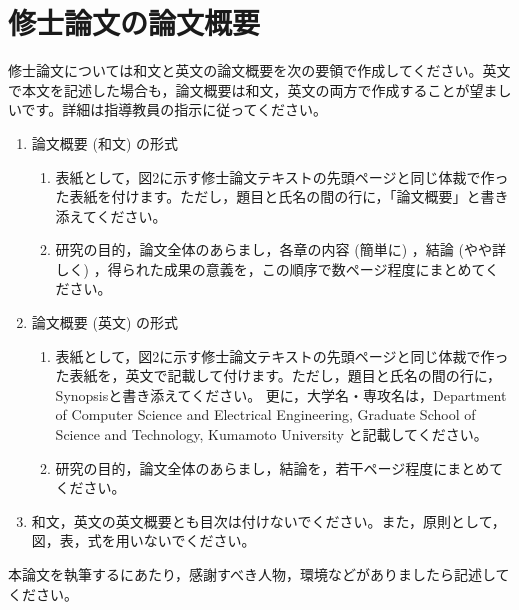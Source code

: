 \documentclass[12pt]{kupaper}
\begin{document}

\chapter{修士論文の論文概要}
修士論文については和文と英文の論文概要を次の要領で作成してください。英文で本文を記述した場合も，論文概要は和文，英文の両方で作成することが望ましいです。詳細は指導教員の指示に従ってください。

\begin{enumerate}[1.]
	\item 論文概要 (和文) の形式
	      \begin{enumerate}[(1)]
		      \item 表紙として，図2に示す修士論文テキストの先頭ページと同じ体裁で作った表紙を付けます。ただし，題目と氏名の間の行に，「論文概要」と書き添えてください。
		      \item 研究の目的，論文全体のあらまし，各章の内容 (簡単に) ，結論 (やや詳しく) ，得られた成果の意義を，この順序で数ページ程度にまとめてください。
	      \end{enumerate}
	\item 論文概要 (英文) の形式
	      \begin{enumerate}[(1)]
		      \item 表紙として，図2に示す修士論文テキストの先頭ページと同じ体裁で作った表紙を，英文で記載して付けます。ただし，題目と氏名の間の行に，Synopsisと書き添えてください。
		            更に，大学名・専攻名は，Department of Computer Science and Electrical Engineering, Graduate School of Science and Technology, Kumamoto University と記載してください。
		      \item 研究の目的，論文全体のあらまし，結論を，若干ページ程度にまとめてください。
	      \end{enumerate}
	\item 和文，英文の英文概要とも目次は付けないでください。また，原則として，図，表，式を用いないでください。
\end{enumerate}

\begin{thanks}
	本論文を執筆するにあたり，感謝すべき人物，環境などがありましたら記述してください。
\end{thanks}



\end{document}

